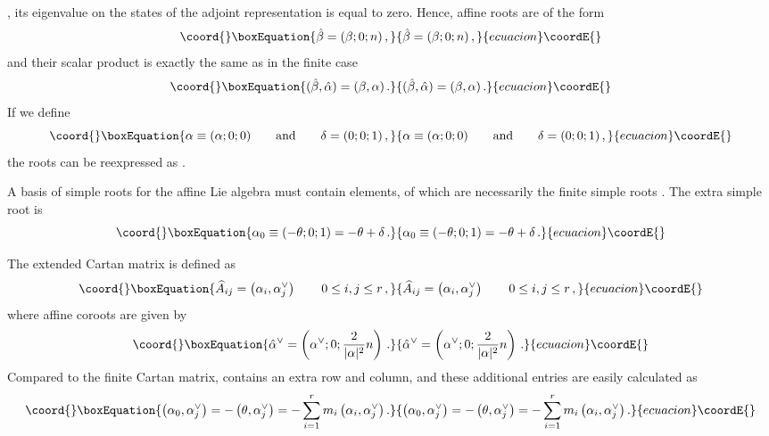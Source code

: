 \documentclass[a4paper,12pt]{report}
\begin{document}
\coordHE{}, its eigenvalue on the states of the adjoint representation is equal to zero. Hence, affine roots are
of the form
\begin{equation}\coord{}\boxEquation{
\hat{\beta}=(\beta;0;n)\,,
}{
\hat{\beta}=(\beta;0;n)\,,
}{ecuacion}\coordE{}\end{equation}
and their scalar product is exactly the same as in the finite case
\begin{equation}\coord{}\boxEquation{
(\hat{\beta},\hat{\alpha})=(\beta,\alpha)\,.
}{
(\hat{\beta},\hat{\alpha})=(\beta,\alpha)\,.
}{ecuacion}\coordE{}\end{equation}
If we define
\begin{equation}\coord{}\boxEquation{
\alpha\equiv(\alpha;0;0)\qquad \textrm{and} \qquad \delta=(0;0;1)\,,
}{
\alpha\equiv(\alpha;0;0)\qquad \textrm{and} \qquad \delta=(0;0;1)\,,
}{ecuacion}\coordE{}\end{equation}
the roots can be reexpressed as \coordHE{}.

A basis of simple roots for the affine Lie algebra must contain \coordHE{} elements, \coordHE{} of which are necessarily the
finite simple roots \coordHE{}. The extra simple root is
\begin{equation}\coord{}\boxEquation{
\alpha_{0}\equiv (-\theta;0;1)=-\theta+\delta\,.
}{
\alpha_{0}\equiv (-\theta;0;1)=-\theta+\delta\,.
}{ecuacion}\coordE{}\end{equation}

The extended Cartan matrix is defined as
\begin{equation}\coord{}\boxEquation{
\widehat{A}_{ij}=\left(\alpha_{i},\alpha_{j}^{\vee}\right)\qquad 0\leq i,j\leq r\,,
}{
\widehat{A}_{ij}=\left(\alpha_{i},\alpha_{j}^{\vee}\right)\qquad 0\leq i,j\leq r\,,
}{ecuacion}\coordE{}\end{equation}
where affine coroots are given by
\begin{equation}\coord{}\boxEquation{
\hat{\alpha}^{\vee}=\left(\alpha^{\vee};0;\frac{2}{|\alpha|^{2}}n\right)\,.
}{
\hat{\alpha}^{\vee}=\left(\alpha^{\vee};0;\frac{2}{|\alpha|^{2}}n\right)\,.
}{ecuacion}\coordE{}\end{equation}
Compared to the finite Cartan matrix, \coordHE{} contains an extra row and column, and these additional
entries are easily calculated as
\begin{equation}\coord{}\boxEquation{
\left(\alpha_{0},\alpha_{j}^{\vee}\right)=-\left(\theta,\alpha_{j}^{\vee}\right)=-\sum_{i=1}^{r}m_{i}\left(\alpha_{i},\alpha_{j}^{\vee}\right).
}{
\left(\alpha_{0},\alpha_{j}^{\vee}\right)=-\left(\theta,\alpha_{j}^{\vee}\right)=-\sum_{i=1}^{r}m_{i}\left(\alpha_{i},\alpha_{j}^{\vee}\right).
}{ecuacion}\coordE{}\end{equation}
\end{document}
